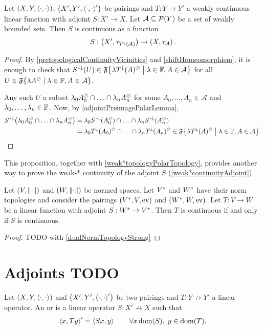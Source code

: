 \begin{proposition}
Let $\left( X,Y,\left\langle \cdot,\cdot \right\rangle \right)$, $\left( X',Y',\left\langle \cdot,\cdot \right\rangle' \right)$ be pairings and $T: Y\to Y'$ a weakly continuous linear function with adjoint $S: X'\to X$. Let $\mathcal{A}\subseteq\operatorname{\mathcal{P}}(Y)$ be a set of weakly bounded sets. Then $S$ is continuous as a function
\[ S: \left( X',\tau_{T^\downarrow(\mathcal{A})} \right) \to \left( X, \tau_{\mathcal{A}} \right). \]
\end{proposition}
\begin{proof}
By \ref{pretopologicalContinuityVicinities} and \ref{shiftHomeomorphism}, it is enough to check that $S^\preimf(U)\in \mathfrak{F}\setbuilder{\lambda T^\imf(A)^\pol}{\lambda\in \F, A\in \mathcal{A}}$ for all $U \in \mathfrak{F}\setbuilder{\lambda A^\pol}{\lambda\in \F, A\in \mathcal{A}}$.

Any such $U$ a subset $\lambda_0 A_0^\oslash \cap \ldots \cap \lambda_n A_n^\oslash$ for some $A_0,\ldots, A_n\in \mathcal{A}$ and $\lambda_0,\ldots, \lambda_n\in \mathbb{F}$. Now, by \ref{adjointPreimagePolarLemma},
\begin{align*}
S^\preimf\big(\lambda_0 A_0^\pol \cap \ldots \cap \lambda_n A_n^\pol\big) &= \lambda_0 S^\preimf(A_0^\pol) \cap \ldots \cap \lambda_n S^\preimf(A_n^\pol) \\
&= \lambda_0 T^\imf(A_0)^\pol \cap \ldots \cap \lambda_n T^\imf(A_n)^\pol \in \mathfrak{F}\setbuilder{\lambda T^\imf(A)^\pol}{\lambda\in \F, A\in \mathcal{A}}.
\end{align*}
\end{proof}
This proposition, together with \ref{weak*topologyPolarTopology}, provides another way to prove the weak-$*$ continuity of the adjoint $S$ (\ref{weak*continuityAdjoint}).
\begin{corollary}
Let $\left( V,\lVert\cdot\rVert \right)$ and $\left( W,\lVert\cdot\rVert \right)$ be normed spaces. Let ${V}^*$ and ${W}^*$ have their norm topologies and consider the pairings $\left( {V}^*, V, \operatorname{ev} \right)$ and $\left( {W}^*, W, \operatorname{ev} \right)$. Let $T: V\to W$ be a linear function with adjoint $S: {W}^* \to {V}^*$. Then $T$ is continuous \textup{if and only if} $S$ is continuous.
\end{corollary}
\begin{proof}
TODO with \ref{dualNormTopologyStrong}
\end{proof}

\section{Adjoints TODO}
\begin{definition}
Let $\left( X,Y,\left\langle \cdot,\cdot \right\rangle \right)$ and $\left( X',Y',\left\langle \cdot,\cdot \right\rangle' \right)$ be two pairings and $T: Y\not\to Y'$ a linear operator. An  or  is a linear operator $S: X'\not\to X$ such that
\[ \left\langle x, Ty \right\rangle' = \left\langle Sx, y \right\rangle \qquad \forall x\operatorname{dom}(S), \; y\in\operatorname{dom}(T). \]
\end{definition}

